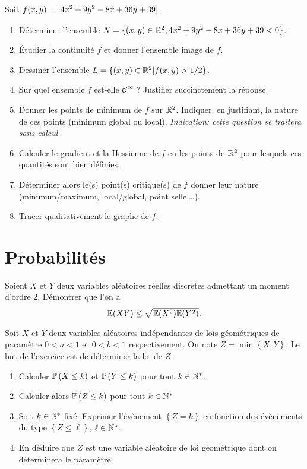 \documentclass{tp_um}
\begin{document}
\exo{} Soit $f(x,y) = \abs{4x^2 + 9y^2 - 8x + 36y + 39}$.%
\begin{enumerate}
	\item Déterminer l'ensemble $ N = \{(x,y) \in \R^2,  4x^2 + 9y^2 - 8x + 36y + 39 <0\}$. 
	\item Étudier la continuité $f$ et donner l'ensemble image de $f$. 
	\item Dessiner l'ensemble $L = \{(x,y) \in \R^2 | f(x,y)> 1/2\}$.
	\item Sur quel ensemble $f$ est-elle $\mathcal C^\infty$ ? Justifier succinctement la réponse.
	\item Donner les points de minimum de $f$ sur $\R^2$. Indiquer, en justifiant, la nature de ces points (minimum global ou local).
		\textit{Indication: cette question se traitera sans calcul}
	\item Calculer le gradient et la Hessienne de $f$ en les points de $\R^2$ pour lesquels ces quantités sont bien définies.
	\item Déterminer alors le(s) point(s) critique(s) de $f$ donner leur nature (minimum/maximum, local/global, point selle,\ldots).
	\item Tracer qualitativement le graphe de $f$.
\end{enumerate}





\bigskip


\section{Probabilités}

 Soient $X$ et $Y$ deux variables aléatoires réelles discrètes admettant un moment d'ordre 2. Démontrer que l'on a 
\[
	\E(XY) \leq  \sqrt{\E(X^2)\E(Y^2)}.
\]



 Soit $X$ et $Y$ deux variables aléatoires indépendantes de lois géométriques de paramètre $0<a<1$ et $0<b<1$ respectivement. On note $Z = \min \left\{ X,Y \right\}$. Le but de l'exercice est de déterminer la loi de $Z$.
\begin{enumerate}
	\item Calculer $\P\left( X \leq k \right)$ et $\P\left( Y\leq k\right)$ pour tout $k\in \N^*$.
	\item Calculer alors $\P\left( Z\leq k \right)$ pour tout $k \in \N^*$
	\item Soit $k\in\N^*$ fixé. Exprimer l'évènement $\left\{ Z = k \right\}$ en fonction des évènements du type $\left\{ Z\leq \ell \right\}$, $\ell\in \N^*$.
	\item En déduire que $Z$ est une variable aléatoire de loi géométrique dont on déterminera le paramètre.
\end{enumerate}
\end{document}

